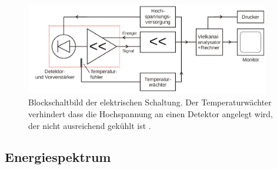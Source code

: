 \begin{figure}
  \centering
  \includegraphics[width=0.95\textwidth]{blockschaltung.png}
  \caption{Blockschaltbild der elektrischen Schaltung. Der Temperaturwächter verhindert dass die Hochspannung
  an einen Detektor angelegt wird, der nicht ausreichend gekühlt ist \cite{anleitungv18}.}
  \label{fig:blockschaltbild}
\end{figure}

\subsection{Energiespektrum}

